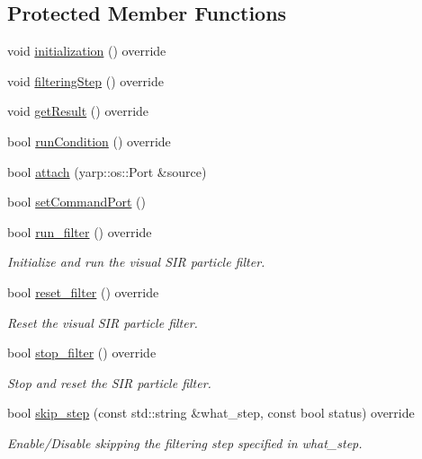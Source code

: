 \subsection*{Protected Member Functions}
\begin{DoxyCompactItemize}
\item 
void \hyperlink{classVisualSIS_a324f4b8554036b0d697423ea7ab865be}{initialization} () override
\item 
void \hyperlink{classVisualSIS_a5c1e7ef8000c981db41cad3c6d17a535}{filtering\+Step} () override
\item 
void \hyperlink{classVisualSIS_a344387f214c60a62b2d79e7377f92693}{get\+Result} () override
\item 
bool \hyperlink{classVisualSIS_af053d8966ebebac8bf8eb8cfce4e4903}{run\+Condition} () override
\item 
bool \hyperlink{classVisualSIS_a2a331e2d6285cb48541df86dcc27b2c1}{attach} (yarp\+::os\+::\+Port \&source)
\item 
bool \hyperlink{classVisualSIS_aac85d36ec741ed93d1659ddf910f7a03}{set\+Command\+Port} ()
\item 
bool \hyperlink{classVisualSIS_aa8ad54a90c9f1f6ca673d8d61721b7be}{run\+\_\+filter} () override
\begin{DoxyCompactList}\small\item\em Initialize and run the visual S\+IR particle filter. \end{DoxyCompactList}\item 
bool \hyperlink{classVisualSIS_a974ca828135835ccb4a2c3b7635b2aea}{reset\+\_\+filter} () override
\begin{DoxyCompactList}\small\item\em Reset the visual S\+IR particle filter. \end{DoxyCompactList}\item 
bool \hyperlink{classVisualSIS_a8e111a001d0dd201a5f661c9ff226bc1}{stop\+\_\+filter} () override
\begin{DoxyCompactList}\small\item\em Stop and reset the S\+IR particle filter. \end{DoxyCompactList}\item 
bool \hyperlink{classVisualSIS_ac9905862d7198c5ae80f7e682500c608}{skip\+\_\+step} (const std\+::string \&what\+\_\+step, const bool status) override
\begin{DoxyCompactList}\small\item\em Enable/\+Disable skipping the filtering step specified in what\+\_\+step. \end{DoxyCompactList}\item 

\end{DoxyCompactItemize}
